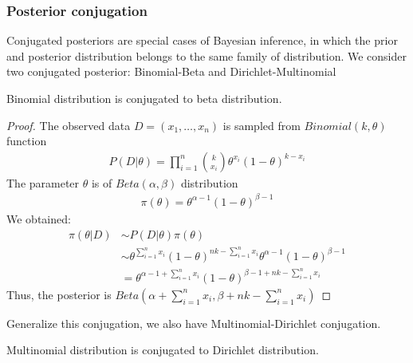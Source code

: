 \subsubsection{Posterior conjugation}
Conjugated posteriors are special cases of Bayesian inference, in which the prior and posterior
distribution belongs to the same family of distribution. We consider two conjugated posterior:
Binomial-Beta and Dirichlet-Multinomial
\begin{lemma}
    Binomial distribution is conjugated to beta distribution.
\end{lemma}
\begin{proof}
    The observed data $D=(x_1,\ldots,x_n)$ is sampled from $Binomial(k, \theta)$ function
    \begin{align*}
        P(D|\theta) = \prod_{i=1}^n{k\choose x_i}\theta^{x_i}(1-\theta)^{k-x_i}
    \end{align*}
    The parameter $\theta$ is of $Beta(\alpha, \beta)$ distribution
    \begin{align*}
        \pi(\theta) = \theta^{\alpha-1}(1-\theta)^{\beta -1}
    \end{align*}
    We obtained:
    \begin{align*}
        \pi(\theta|D) & \sim P(D|\theta)\pi(\theta)                                                                             \\
                      & \sim \theta^{\sum_{i=1}^n x_i}(1-\theta)^{nk -\sum_{i=1}^n x_i} \theta^{\alpha -1} (1-\theta)^{\beta-1} \\
                      & = \theta^{\alpha - 1 + \sum_{i=1}^n x_i}(1-\theta)^{\beta - 1 + nk -\sum_{i=1}^n x_i}
    \end{align*}
    Thus, the posterior is $Beta(\alpha + \sum_{i=1}^n x_i, \beta + nk -\sum_{i=1}^n x_i)$
\end{proof}
Generalize this conjugation, we also have Multinomial-Dirichlet conjugation.
\begin{lemma}
    Multinomial distribution is conjugated to Dirichlet distribution.
\end{lemma}
